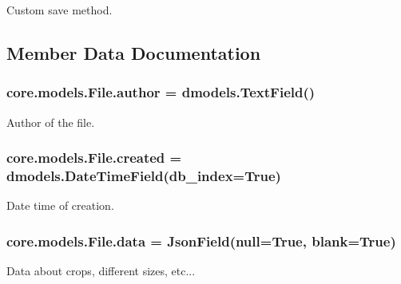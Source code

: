 Custom save method. 



\subsection{Member Data Documentation}
\hypertarget{classcore_1_1models_1_1File_a4b56e6ce2f5bd75ad78f41cea297fd49}{
\subsubsection[{author}]{\setlength{\rightskip}{0pt plus 5cm}core.\-models.\-File.\-author = dmodels.\-Text\-Field()\hspace{0.3cm}{\ttfamily [static]}}}\label{classcore_1_1models_1_1File_a4b56e6ce2f5bd75ad78f41cea297fd49}


Author of the file. 

\hypertarget{classcore_1_1models_1_1File_adaa3cc04ed44b20d1796df296373e9ba}{
\subsubsection[{created}]{\setlength{\rightskip}{0pt plus 5cm}core.\-models.\-File.\-created = dmodels.\-Date\-Time\-Field(db\-\_\-index=True)\hspace{0.3cm}{\ttfamily [static]}}}\label{classcore_1_1models_1_1File_adaa3cc04ed44b20d1796df296373e9ba}


Date time of creation. 

\hypertarget{classcore_1_1models_1_1File_a786c3b3f61bd0e38ea5d32310391a235}{
\subsubsection[{data}]{\setlength{\rightskip}{0pt plus 5cm}core.\-models.\-File.\-data = {\bf Json\-Field}(null=True, blank=True)\hspace{0.3cm}{\ttfamily [static]}}}\label{classcore_1_1models_1_1File_a786c3b3f61bd0e38ea5d32310391a235}


Data about crops, different sizes, etc... 

